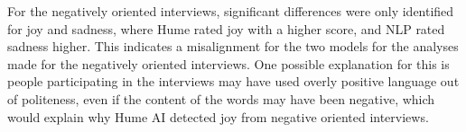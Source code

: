 For the negatively oriented interviews, significant differences were only identified for joy and sadness, where Hume rated joy with a higher score, and NLP rated sadness higher. This indicates a misalignment for the two models for the analyses made for the negatively oriented interviews. One possible explanation for this is people participating in the interviews may have used overly positive language out of politeness, even if the content of the words may have been negative, which would explain why Hume AI detected joy from negative oriented interviews.

